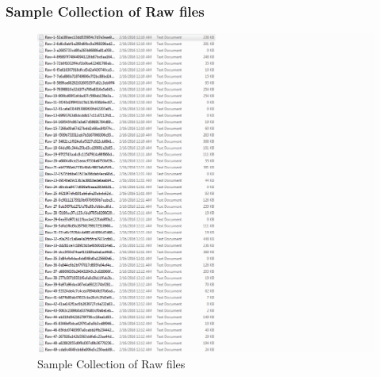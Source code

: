 \subsubsection{Sample Collection of Raw files}
\begin{figure}[ht]    
    \begin{center}
        \includegraphics[scale=0.6]{raw_coll.png}
        \caption{Sample Collection of Raw files}
        \label{Sample Collection of Raw files}
    \end{center}
\end{figure}
\newpage
